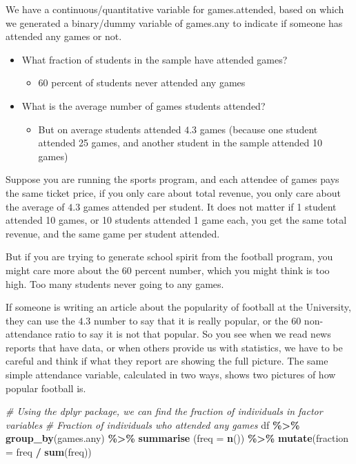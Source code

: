 \documentclass[
]{book}
\newenvironment{Shaded}{\begin{snugshade}}{\end{snugshade}}
\newcommand{\CommentTok}[1]{\textcolor[rgb]{0.56,0.35,0.01}{\textit{#1}}}
\newcommand{\DataTypeTok}[1]{\textcolor[rgb]{0.13,0.29,0.53}{#1}}
\newcommand{\KeywordTok}[1]{\textcolor[rgb]{0.13,0.29,0.53}{\textbf{#1}}}
\newcommand{\NormalTok}[1]{#1}
\newcommand{\OperatorTok}[1]{\textcolor[rgb]{0.81,0.36,0.00}{\textbf{#1}}}
\newcommand{\StringTok}[1]{\textcolor[rgb]{0.31,0.60,0.02}{#1}}
\providecommand{\tightlist}{%
  \setlength{\itemsep}{0pt}\setlength{\parskip}{0pt}}
\begin{document}
We have a continuous/quantitative variable for games.attended, based on which we generated a binary/dummy variable of games.any to indicate if someone has attended any games or not.

\begin{itemize}
\tightlist
\item
  What fraction of students in the sample have attended games?

  \begin{itemize}
  \tightlist
  \item
    \(60\) percent of students never attended any games
  \end{itemize}
\item
  What is the average number of games students attended?

  \begin{itemize}
  \tightlist
  \item
    But on average students attended \(4.3\) games (because one student attended 25 games, and another student in the sample attended 10 games)
  \end{itemize}
\end{itemize}

Suppose you are running the sports program, and each attendee of games pays the same ticket price, if you only care about total revenue, you only care about the average of \(4.3\) games attended per student. It does not matter if 1 student attended 10 games, or 10 students attended 1 game each, you get the same total revenue, and the same game per student attended.

But if you are trying to generate school spirit from the football program, you might care more about the \(60\) percent number, which you might think is too high. Too many students never going to any games.

If someone is writing an article about the popularity of football at the University, they can use the \(4.3\) number to say that it is really popular, or the \(60\) non-attendance ratio to say it is not that popular. So you see when we read news reports that have data, or when others provide us with statistics, we have to be careful and think if what they report are showing the full picture. The same simple attendance variable, calculated in two ways, shows two pictures of how popular football is.

\begin{Shaded}
\begin{Highlighting}[]
\CommentTok{\# Using the dplyr package, we can find the fraction of individuals in factor variables}
\CommentTok{\# Fraction of individuals who attended any games}
\NormalTok{df }\OperatorTok{\%\textgreater{}\%}
\StringTok{  }\KeywordTok{group\_by}\NormalTok{(games.any) }\OperatorTok{\%\textgreater{}\%}
\StringTok{  }\KeywordTok{summarise}\NormalTok{ (}\DataTypeTok{freq =} \KeywordTok{n}\NormalTok{()) }\OperatorTok{\%\textgreater{}\%}
\StringTok{  }\KeywordTok{mutate}\NormalTok{(}\DataTypeTok{fraction =}\NormalTok{ freq }\OperatorTok{/}\StringTok{ }\KeywordTok{sum}\NormalTok{(freq))}
\end{Highlighting}
\end{Shaded}
\end{document}
